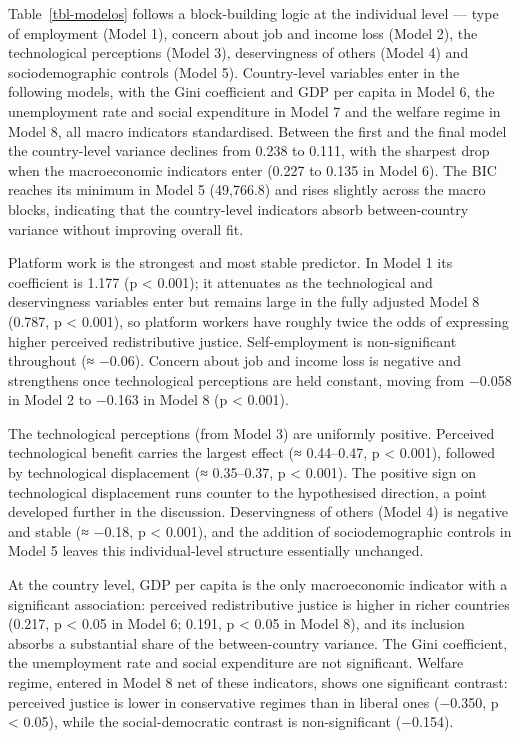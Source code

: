 \documentclass[
  12pt,
]{article}
\begin{document}
Table~\ref{tbl-modelos} follows a block-building logic at the individual
level --- type of employment (Model 1), concern about job and income
loss (Model 2), the technological perceptions (Model 3), deservingness
of others (Model 4) and sociodemographic controls (Model 5).
Country-level variables enter in the following models, with the Gini
coefficient and GDP per capita in Model 6, the unemployment rate and
social expenditure in Model 7 and the welfare regime in Model 8, all
macro indicators standardised. Between the first and the final model the
country-level variance declines from 0.238 to 0.111, with the sharpest
drop when the macroeconomic indicators enter (0.227 to 0.135 in Model
6). The BIC reaches its minimum in Model 5 (49,766.8) and rises slightly
across the macro blocks, indicating that the country-level indicators
absorb between-country variance without improving overall fit.

Platform work is the strongest and most stable predictor. In Model 1 its
coefficient is 1.177 (p \textless{} 0.001); it attenuates as the
technological and deservingness variables enter but remains large in the
fully adjusted Model 8 (0.787, p \textless{} 0.001), so platform workers
have roughly twice the odds of expressing higher perceived
redistributive justice. Self-employment is non-significant throughout (≈
−0.06). Concern about job and income loss is negative and strengthens
once technological perceptions are held constant, moving from −0.058 in
Model 2 to −0.163 in Model 8 (p \textless{} 0.001).

The technological perceptions (from Model 3) are uniformly positive.
Perceived technological benefit carries the largest effect (≈
0.44--0.47, p \textless{} 0.001), followed by technological displacement
(≈ 0.35--0.37, p \textless{} 0.001). The positive sign on technological
displacement runs counter to the hypothesised direction, a point
developed further in the discussion. Deservingness of others (Model 4)
is negative and stable (≈ −0.18, p \textless{} 0.001), and the addition
of sociodemographic controls in Model 5 leaves this individual-level
structure essentially unchanged.

At the country level, GDP per capita is the only macroeconomic indicator
with a significant association: perceived redistributive justice is
higher in richer countries (0.217, p \textless{} 0.05 in Model 6; 0.191,
p \textless{} 0.05 in Model 8), and its inclusion absorbs a substantial
share of the between-country variance. The Gini coefficient, the
unemployment rate and social expenditure are not significant. Welfare
regime, entered in Model 8 net of these indicators, shows one
significant contrast: perceived justice is lower in conservative regimes
than in liberal ones (−0.350, p \textless{} 0.05), while the
social-democratic contrast is non-significant (−0.154).
\end{document}
